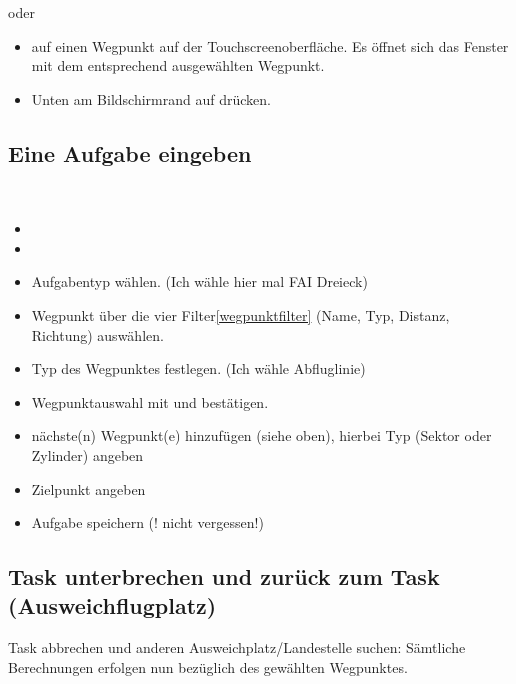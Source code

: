 oder

\begin{itemize}
\item \dklick auf einen Wegpunkt auf der Touchscreenoberfläche. Es öffnet sich das Fenster  mit dem entsprechend ausgewählten Wegpunkt.
\item Unten am Bildschirmrand auf  drücken.
\end{itemize}


\subsection{Eine Aufgabe eingeben}\label{aufgabeeingeben}
\blink~\blink~
\begin{itemize}
\item {}
\item {}
\item Aufgabentyp wählen. (Ich wähle hier mal \textsf{FAI Dreieck})
\item {} Wegpunkt über die vier Filter\ref{wegpunktfilter} (Name, Typ, Distanz, Richtung) auswählen.
\item Typ des Wegpunktes festlegen. (Ich wähle \textsf{Abfluglinie})
\item Wegpunktauswahl  mit   und  bestätigen.
\item nächste(n) Wegpunkt(e) hinzufügen (siehe oben), hierbei Typ (Sektor oder Zylinder) angeben
\item Zielpunkt angeben
\item Aufgabe speichern (! nicht vergessen!)
\end{itemize}

\subsection{Task unterbrechen und zurück zum Task (Ausweichflugplatz)}
Task abbrechen und anderen Ausweichplatz/Landestelle suchen:
Sämtliche Berechnungen  erfolgen nun bezüglich des gewählten Wegpunktes.

